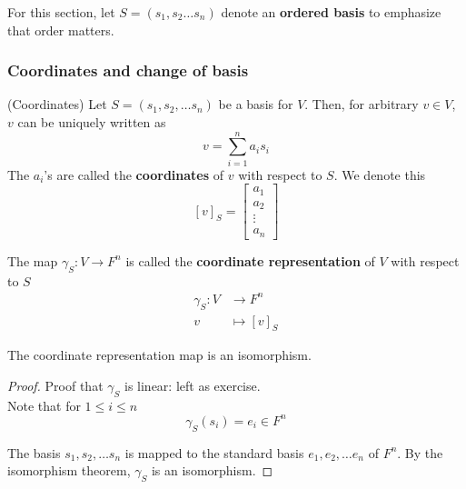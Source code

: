For this section, let $S = (s_1, s_2 \hdots s_n)$ denote an \textbf{ordered basis} to emphasize that order matters. 

\subsubsection{Coordinates and change of basis}

\begin{definition}
    (Coordinates) Let $S = (s_1, s_2, \hdots s_n)$ be a basis for $V$. Then, for arbitrary $v \in V$, $v$ can be uniquely written as 
    \[
        v = \sum\limits_{i = 1}^{n} a_i s_i
    \]
    The $a_i$'s are called the \textbf{coordinates} of $v$ with respect to $S$. We denote this 
    \[
        [v]_S = \begin{bmatrix} 
            a_1 \\ a_2 \\ \vdots \\ a_n
        \end{bmatrix}
    \]

    The map $\gamma_S : V \to F^n$ is called the \textbf{coordinate representation} of $V$ with respect to $S$ 
    \begin{align*}
        \gamma_S : V &\to F^n \\
        v & \mapsto [v]_S
    \end{align*}
\end{definition}

\begin{remark}
    The coordinate representation map is an isomorphism.
\end{remark}

\begin{proof}
    Proof that $\gamma_S$ is linear: left as exercise. \\

    Note that for $1 \leq i \leq n$
    \[
        \gamma_S(s_i) = e_i \in F^n
    \]

    The basis $s_1, s_2, \hdots s_n$ is mapped to the standard basis $e_1, e_2, \hdots e_n$ of $F^n$. By the isomorphism theorem, $\gamma_S$ is an isomorphism.
\end{proof}

